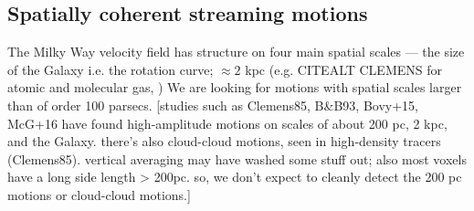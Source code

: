 

\subsection{Spatially coherent streaming motions}
\label{sec:rotation_discussion}
The Milky Way velocity field has structure on four main spatial scales --- the size of the Galaxy i.e. the rotation curve; $\approx 2$ kpc (e.g. CITEALT CLEMENS for atomic and molecular gas, )
We are looking for motions with spatial scales larger than of order 100 parsecs.
[studies such as Clemens85, B&B93, Bovy+15, McG+16 have found high-amplitude motions on scales of about 200 pc, 2 kpc, and the Galaxy. there's also cloud-cloud motions, seen in high-density tracers (Clemens85). vertical averaging may have washed some stuff out; also most voxels have a long side length > 200pc. so, we don't expect to cleanly detect the 200 pc motions or cloud-cloud motions.]


